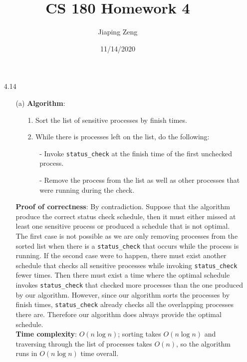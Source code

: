 \documentclass{article}
\title{CS 180 Homework 4}
\date{11/14/2020}
\author{Jiaping Zeng}
\begin{document}
\maketitle

\begin{itemize}
      \item [4.14]
            \begin{itemize}
                  \item [(a)]
                        \textbf{Algorithm}:
                        \begin{itemize}
                              \item [1.] Sort the list of sensitive processes by finish times.
                              \item [2.] While there is processes left on the list, do the following:
                                    \begin{itemize}
                                          \item [-] Invoke \texttt{status\_check} at the finish time of the first unchecked process.
                                          \item [-] Remove the process from the list as well as other processes that were running during the check.
                                    \end{itemize}
                        \end{itemize}
                        \textbf{Proof of correctness}: By contradiction. Suppose that the algorithm produce the correct status check schedule, then it must either missed at least one sensitive process or produced a schedule that is not optimal. The first case is not possible as we are only removing processes from the sorted list when there is a \texttt{status\_check} that occurs while the process is running. If the second case were to happen, there must exist another schedule that checks all sensitive processes while invoking \texttt{status\_check} fewer times. Then there must exist a time where the optimal schedule invokes \texttt{status\_check} that checked more processes than the one produced by our algorithm. However, since our algorithm sorts the processes by finish times, \texttt{status\_check} already checks all the overlapping processes there are. Therefore our algorithm does always provide the optimal schedule.\\
                        \textbf{Time complexity}: $O(n\log n)$; sorting takes $O(n\log n)$ and traversing through the list of processes takes $O(n)$, so the algorithm runs in $O(n\log n)$ time overall.

\end{itemize}
\end{itemize}
\end{document}
